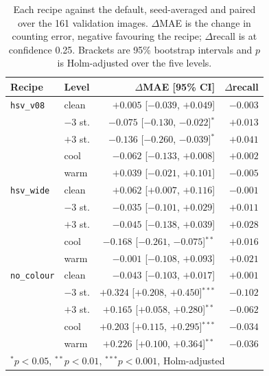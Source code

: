 \begin{table}[t]
\caption{Each recipe against the default, seed-averaged and paired over the 161
validation images. $\Delta$MAE is the change in counting error, negative
favouring the recipe; $\Delta$recall is at confidence 0.25. Brackets are 95\%
bootstrap intervals and $p$ is Holm-adjusted over the five levels.}
\label{tab:seed-tests}
\centering
\begin{tabular}{llrr}
\toprule
Recipe & Level & $\Delta$MAE [95\% CI] & $\Delta$recall \\
\midrule
\texttt{hsv\_v08}  & clean    & $+0.005$ [$-0.039$, $+0.049$] & $-0.003$ \\
                   & $-3$ st. & $-0.075$ [$-0.130$, $-0.022$]$^{*}$ & $+0.013$ \\
                   & $+3$ st. & $-0.136$ [$-0.260$, $-0.039$]$^{*}$ & $+0.041$ \\
                   & cool     & $-0.062$ [$-0.133$, $+0.008$] & $+0.002$ \\
                   & warm     & $+0.039$ [$-0.021$, $+0.101$] & $-0.005$ \\
\midrule
\texttt{hsv\_wide} & clean    & $+0.062$ [$+0.007$, $+0.116$] & $-0.001$ \\
                   & $-3$ st. & $-0.035$ [$-0.101$, $+0.029$] & $+0.011$ \\
                   & $+3$ st. & $-0.045$ [$-0.138$, $+0.039$] & $+0.028$ \\
                   & cool     & $-0.168$ [$-0.261$, $-0.075$]$^{**}$ & $+0.016$ \\
                   & warm     & $-0.001$ [$-0.108$, $+0.093$] & $+0.021$ \\
\midrule
\texttt{no\_colour}& clean    & $-0.043$ [$-0.103$, $+0.017$] & $+0.001$ \\
                   & $-3$ st. & $+0.324$ [$+0.208$, $+0.450$]$^{***}$ & $-0.102$ \\
                   & $+3$ st. & $+0.165$ [$+0.058$, $+0.280$]$^{**}$ & $-0.062$ \\
                   & cool     & $+0.203$ [$+0.115$, $+0.295$]$^{***}$ & $-0.034$ \\
                   & warm     & $+0.226$ [$+0.100$, $+0.364$]$^{**}$ & $-0.036$ \\
\bottomrule
\multicolumn{4}{l}{\scriptsize $^{*}p<0.05$, $^{**}p<0.01$, $^{***}p<0.001$, Holm-adjusted} \\
\end{tabular}
\end{table}

